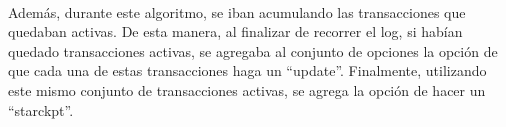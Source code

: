 \documentclass[11pt, a4paper]{article}
\begin{document}
\paragraph{}
Además, durante este algoritmo, se iban acumulando las transacciones que quedaban activas. De esta manera, al finalizar de recorrer el log, si habían quedado transacciones activas, se agregaba al conjunto de opciones la opción de que cada una de estas transacciones haga un ``update''. Finalmente, utilizando este mismo conjunto de transacciones activas, se agrega la opción de hacer un ``starckpt''.
\end{document}
